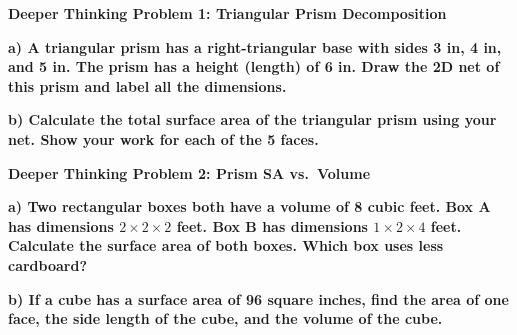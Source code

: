 \documentclass[12pt, letterpaper, fleqn]{article}
\begin{document}
\begin{tcolorbox}[colback=black!5, colframe=black!50, boxrule=1pt, arc=4mm, left=6mm, right=6mm, top=5mm, bottom=5mm]
\textbf{Deeper Thinking Problem 1: Triangular Prism Decomposition}

\medskip

\noindent
\textbf{a) A triangular prism has a right-triangular base with sides 3 in, 4 in, and 5 in. The prism has a height (length) of 6 in. Draw the 2D net of this prism and label all the dimensions.}

\vspace{2.5cm}

\noindent
\textbf{b) Calculate the total surface area of the triangular prism using your net. Show your work for each of the 5 faces.}

\vspace{2cm}
\end{tcolorbox}
\newpage

\begin{tcolorbox}[colback=black!5, colframe=black!50, boxrule=1pt, arc=4mm, left=6mm, right=6mm, top=5mm, bottom=5mm]
\textbf{Deeper Thinking Problem 2: Prism SA vs.\ Volume}

\medskip

\noindent
\textbf{a) Two rectangular boxes both have a volume of 8 cubic feet. Box A has dimensions $2 \times 2 \times 2$ feet. Box B has dimensions $1 \times 2 \times 4$ feet. Calculate the surface area of both boxes. Which box uses less cardboard?}

\vspace{2.5cm}

\noindent
\textbf{b) If a cube has a surface area of 96 square inches, find the area of one face, the side length of the cube, and the volume of the cube.}

\vspace{2cm}
\end{tcolorbox}
\newpage
\end{document}
